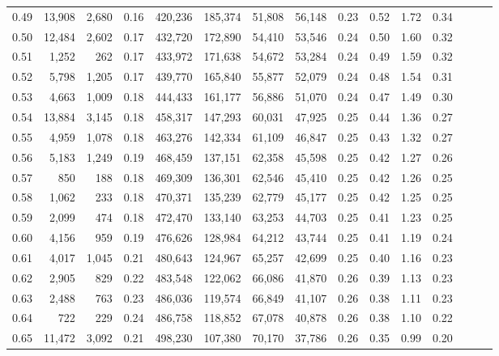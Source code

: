 \begin{tabular}{rrrrrrrrrrrrrrr}
0.49 &  13,908 &  2,680 &  0.16 &  420,236 &  185,374 &   51,808 &   56,148 &  0.23 &  0.52 &  1.72 &      0.34 \\
0.50 &  12,484 &  2,602 &  0.17 &  432,720 &  172,890 &   54,410 &   53,546 &  0.24 &  0.50 &  1.60 &      0.32 \\
0.51 &   1,252 &    262 &  0.17 &  433,972 &  171,638 &   54,672 &   53,284 &  0.24 &  0.49 &  1.59 &      0.32 \\
0.52 &   5,798 &  1,205 &  0.17 &  439,770 &  165,840 &   55,877 &   52,079 &  0.24 &  0.48 &  1.54 &      0.31 \\
0.53 &   4,663 &  1,009 &  0.18 &  444,433 &  161,177 &   56,886 &   51,070 &  0.24 &  0.47 &  1.49 &      0.30 \\
0.54 &  13,884 &  3,145 &  0.18 &  458,317 &  147,293 &   60,031 &   47,925 &  0.25 &  0.44 &  1.36 &      0.27 \\
0.55 &   4,959 &  1,078 &  0.18 &  463,276 &  142,334 &   61,109 &   46,847 &  0.25 &  0.43 &  1.32 &      0.27 \\
0.56 &   5,183 &  1,249 &  0.19 &  468,459 &  137,151 &   62,358 &   45,598 &  0.25 &  0.42 &  1.27 &      0.26 \\
0.57 &     850 &    188 &  0.18 &  469,309 &  136,301 &   62,546 &   45,410 &  0.25 &  0.42 &  1.26 &      0.25 \\
0.58 &   1,062 &    233 &  0.18 &  470,371 &  135,239 &   62,779 &   45,177 &  0.25 &  0.42 &  1.25 &      0.25 \\
0.59 &   2,099 &    474 &  0.18 &  472,470 &  133,140 &   63,253 &   44,703 &  0.25 &  0.41 &  1.23 &      0.25 \\
0.60 &   4,156 &    959 &  0.19 &  476,626 &  128,984 &   64,212 &   43,744 &  0.25 &  0.41 &  1.19 &      0.24 \\
0.61 &   4,017 &  1,045 &  0.21 &  480,643 &  124,967 &   65,257 &   42,699 &  0.25 &  0.40 &  1.16 &      0.23 \\
0.62 &   2,905 &    829 &  0.22 &  483,548 &  122,062 &   66,086 &   41,870 &  0.26 &  0.39 &  1.13 &      0.23 \\
0.63 &   2,488 &    763 &  0.23 &  486,036 &  119,574 &   66,849 &   41,107 &  0.26 &  0.38 &  1.11 &      0.23 \\
0.64 &     722 &    229 &  0.24 &  486,758 &  118,852 &   67,078 &   40,878 &  0.26 &  0.38 &  1.10 &      0.22 \\
0.65 &  11,472 &  3,092 &  0.21 &  498,230 &  107,380 &   70,170 &   37,786 &  0.26 &  0.35 &  0.99 &      0.20 \\

\end{tabular}
